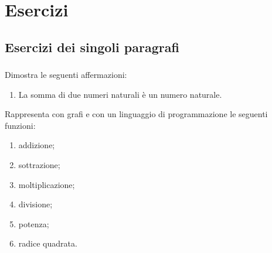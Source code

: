 
\section{Esercizi}

\subsection{Esercizi dei singoli paragrafi}

\subsubsection*{}

\begin{esercizio}
Dimostra le seguenti affermazioni:
 \begin{enumerate}[noitemsep, label=(\alph*)]
 \item La somma di due numeri naturali è un numero naturale.
 \end{enumerate}
\end{esercizio}

\begin{esercizio}
Rappresenta con grafi e con un linguaggio di programmazione le seguenti
funzioni:
\begin{multicols}{3}
 \begin{enumerate}[noitemsep, label=(\alph*)]
 \item addizione; \qquad
 \item sottrazione; \qquad
 \item moltiplicazione; \qquad
 \item divisione; \qquad
 \item potenza; \qquad
 \item radice quadrata.
 \end{enumerate}
\end{multicols}
\end{esercizio}

